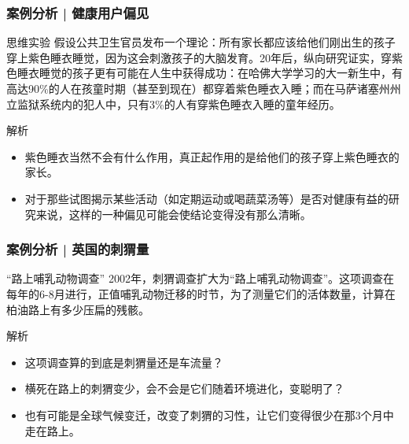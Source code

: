 \begin{frame}
  \frametitle{案例分析 | 健康用户偏见}
   \begin{block}{思维实验}
     假设公共卫生官员发布一个理论：所有家长都应该给他们刚出生的孩子穿上紫色睡衣睡觉，因为这会刺激孩子的大脑发育。20年后，纵向研究证实，穿紫色睡衣睡觉的孩子更有可能在人生中获得成功：在哈佛大学学习的大一新生中，有高达90\%的人在孩童时期（甚至到现在）都穿着紫色睡衣入睡；而在马萨诸塞州州立监狱系统内的犯人中，只有3\%的人有穿紫色睡衣入睡的童年经历。
   \end{block} 
  \pause \pause \pause \pause
   \begin{block}{解析}
     \begin{itemize}
       \item 紫色睡衣当然不会有什么作用，真正起作用的是给他们的孩子穿上紫色睡衣的家长。
       \item 对于那些试图揭示某些活动（如定期运动或喝蔬菜汤等）是否对健康有益的研究来说，这样的一种偏见可能会使结论变得没有那么清晰。
     \end{itemize}
   \end{block}
\end{frame}

\begin{frame}
  \frametitle{案例分析 | 英国的刺猬量}
  \begin{block}{“路上哺乳动物调查”}
    2002年，刺猬调查扩大为“路上哺乳动物调查”。这项调查在每年的6-8月进行，正值哺乳动物迁移的时节，为了测量它们的活体数量，计算在柏油路上有多少压扁的残骸。
  \end{block}
  \pause \pause \pause \pause
  \begin{block}{解析}
    \begin{itemize}
      \item 这项调查算的到底是刺猬量还是车流量？
      \item 横死在路上的刺猬变少，会不会是它们随着环境进化，变聪明了？
      \item 也有可能是全球气候变迁，改变了刺猬的习性，让它们变得很少在那3个月中走在路上。
    \end{itemize}
  \end{block}
\end{frame}

